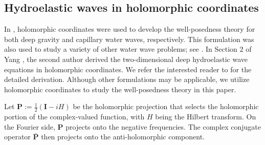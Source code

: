 \documentclass[10pt]{amsart}
\theoremstyle{remark}
\theoremstyle{definition}
\numberwithin{equation}{section}
\newcommand{\nP}{{\mathbf P}}
\begin{document}
\subsection{Hydroelastic waves in holomorphic coordinates}
In \cite{MR3535894,MR3667289}, holomorphic coordinates were used to develop the well-posedness theory for both deep  gravity and capillary water waves, respectively.
This formulation was also used to study a variety of other water wave problems; see  \cite{MR3535894, MR3499085, MR3625189,  AIT, MR4483135, MR4462478, MR4858219, MR4891579}.
In Section $2$ of Yang \cite{MR4846707}, the second author derived the two-dimensional deep hydroelastic wave equations in holomorphic coordinates.
We refer the interested reader to \cite{MR4846707} for the detailed derivation.
Although other formulations may be applicable, we utilize holomorphic coordinates to study the well-posedness theory in this paper.

Let $\mathbf{P}:= \frac{1}{2}(\mathbf{I} - iH)$ be the holomorphic projection that selects the holomorphic portion of the complex-valued function, with $H$ being the Hilbert transform.
On the Fourier side, $\nP$ projects onto the negative frequencies.
The complex conjugate operator $\bar{\nP}$ then projects onto the anti-holomorphic component.
\end{document}
